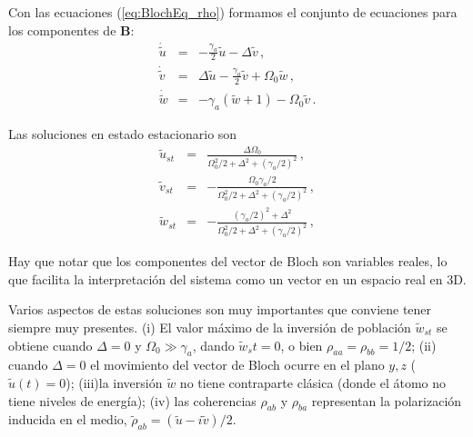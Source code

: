 \documentclass[twocolumn,aps,eqsecnum]{revtex4}
\newcommand{\mbB}{\mathbf{B}}
\begin{document}
Con las ecuaciones (\ref{eq:BlochEq_rho}) formamos el conjunto de 
ecuaciones para los componentes de $\mbB$: 
%
\begin{subequations}
\begin{eqnarray}
\dot{\tilde{u}} &=& -\frac{\gamma_a}{2} \tilde{u} - \Delta \tilde{v} \,, \\ 
\dot{\tilde{v}} &=& \Delta \tilde{u} - \frac{\gamma_a}{2} \tilde{v} 
	+\Omega_0 \tilde{w} \,, \\
\dot{\tilde{w}} &=& -\gamma_a (\tilde{w} +1) -\Omega_0 \tilde{v} \,. 
\end{eqnarray}
\end{subequations}

Las soluciones en estado estacionario son
%
\begin{subequations}
\begin{eqnarray}
\tilde{u}_{st} &=& \frac{\Delta \Omega_0}
	{\Omega_0^2/2 +\Delta^2 +(\gamma_a/2)^2 } \,, \\ 
\tilde{v}_{st} &=& -\frac{ \Omega_0 \gamma_a/2}
	{\Omega_0^2/2 +\Delta^2 +(\gamma_a/2)^2 } \,, \\
\tilde{w}_{st} &=& - \frac{(\gamma_a/2)^2 +\Delta^2}
	{\Omega_0^2/2 +\Delta^2 +(\gamma_a/2)^2 }\,, 
\end{eqnarray}
\end{subequations}

Hay que notar que los componentes del vector de Bloch son variables 
reales, lo que facilita la interpretaci\'on del sistema como un vector en 
un espacio real en 3D.

Varios aspectos de estas soluciones son muy importantes que conviene 
tener siempre muy presentes. (i) El valor m\'aximo de la inversi\'on de 
poblaci\'on $\tilde{w}_{st}$ se obtiene cuando $\Delta=0$ y 
$\Omega_0 \gg \gamma_a$, dando $\tilde{w}_st =0$, o bien 
$\rho_{aa} = \rho_{bb} =1/2$; (ii) cuando $\Delta=0$ el movimiento del 
vector de Bloch ocurre en el plano $y,z$ ($\tilde{u}(t)=0$); (iii)la inversi\'on 
$\tilde{w}$ no tiene contraparte cl\'asica (donde el \'atomo no tiene niveles 
de energ\'ia); (iv) las coherencias $\rho_{ab}$ y $\rho_{ba}$ representan 
la polarizaci\'on inducida en el medio, 
$\tilde{\rho}_{ab} = (\tilde{u} -i \tilde{v})/2$.
\end{document}
